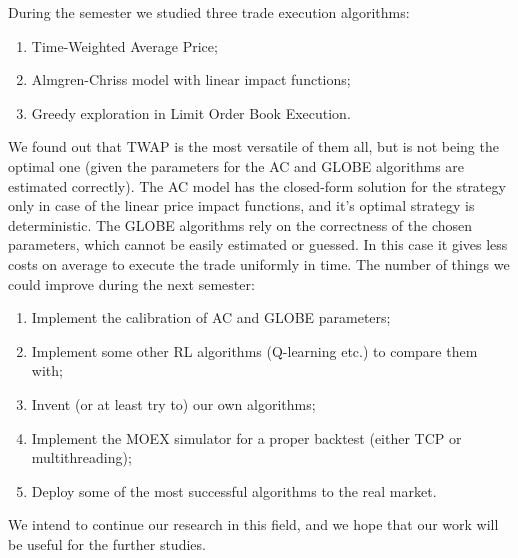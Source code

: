 \conclusion %
    During the semester we studied three trade execution algorithms:
    \begin{enumerate}
        \item Time-Weighted Average Price;
        \item Almgren-Chriss model with linear impact functions;
        \item Greedy exploration in Limit Order Book Execution.
    \end{enumerate}
    We found out that TWAP is the most versatile of them all, but is not being the optimal one (given the parameters for the AC and GLOBE algorithms are estimated correctly). 
    The AC model has the closed-form solution for the strategy only in case of the 
    linear price impact functions, and it's optimal strategy is deterministic.
    The GLOBE algorithms rely on the correctness of the chosen parameters, which cannot be easily estimated or guessed.
    In this case it gives less costs on average to execute the trade uniformly in time.
    The number of things we could improve during the next semester:
    \begin{enumerate}
        \item Implement the calibration of AC and GLOBE parameters;
        \item Implement some other RL algorithms (Q-learning etc.) to compare them with;
        \item Invent (or at least try to) our own algorithms;
        \item Implement the MOEX simulator for a proper backtest (either TCP or multithreading);
        \item Deploy some of the most successful algorithms to the real market.
    \end{enumerate}

    We intend to continue our research in this field, and we hope that our work will be useful for the further studies.